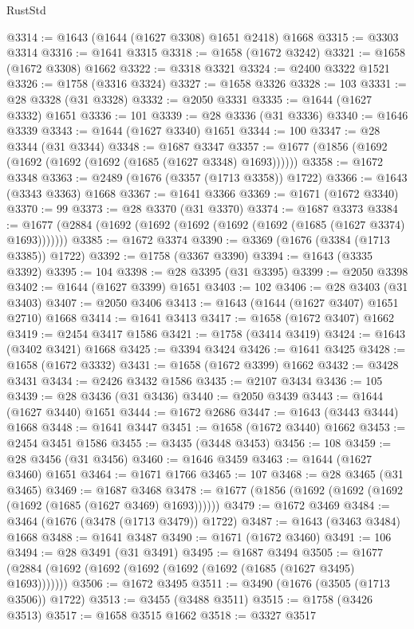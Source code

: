 \begin{lexlean}{RustStd}
\begin{coremodule}
@3314 := @1643 (@1644 (@1627 @3308) @1651 @2418) @1668
@3315 := @3303 @3314
@3316 := @1641 @3315
@3318 := @1658 (@1672 @3242)
@3321 := @1658 (@1672 @3308) @1662
@3322 := @3318 @3321
@3324 := @2400 @3322 @1521
@3326 := @1758 (@3316 @3324)
@3327 := @1658 @3326
@3328 := 103
@3331 := @28 @3328 (@31 @3328)
@3332 := @2050 @3331
@3335 := @1644 (@1627 @3332) @1651
@3336 := 101
@3339 := @28 @3336 (@31 @3336)
@3340 := @1646 @3339
@3343 := @1644 (@1627 @3340) @1651
@3344 := 100
@3347 := @28 @3344 (@31 @3344)
@3348 := @1687 @3347
@3357 := @1677 (@1856 (@1692 (@1692 (@1692 (@1692 (@1685 (@1627 @3348) @1693))))))
@3358 := @1672 @3348
@3363 := @2489 (@1676 (@3357 (@1713 @3358)) @1722)
@3366 := @1643 (@3343 @3363) @1668
@3367 := @1641 @3366
@3369 := @1671 (@1672 @3340)
@3370 := 99
@3373 := @28 @3370 (@31 @3370)
@3374 := @1687 @3373
@3384 := @1677 (@2884 (@1692 (@1692 (@1692 (@1692 (@1692 (@1685 (@1627 @3374) @1693)))))))
@3385 := @1672 @3374
@3390 := @3369 (@1676 (@3384 (@1713 @3385)) @1722)
@3392 := @1758 (@3367 @3390)
@3394 := @1643 (@3335 @3392)
@3395 := 104
@3398 := @28 @3395 (@31 @3395)
@3399 := @2050 @3398
@3402 := @1644 (@1627 @3399) @1651
@3403 := 102
@3406 := @28 @3403 (@31 @3403)
@3407 := @2050 @3406
@3413 := @1643 (@1644 (@1627 @3407) @1651 @2710) @1668
@3414 := @1641 @3413
@3417 := @1658 (@1672 @3407) @1662
@3419 := @2454 @3417 @1586
@3421 := @1758 (@3414 @3419)
@3424 := @1643 (@3402 @3421) @1668
@3425 := @3394 @3424
@3426 := @1641 @3425
@3428 := @1658 (@1672 @3332)
@3431 := @1658 (@1672 @3399) @1662
@3432 := @3428 @3431
@3434 := @2426 @3432 @1586
@3435 := @2107 @3434
@3436 := 105
@3439 := @28 @3436 (@31 @3436)
@3440 := @2050 @3439
@3443 := @1644 (@1627 @3440) @1651
@3444 := @1672 @2686
@3447 := @1643 (@3443 @3444) @1668
@3448 := @1641 @3447
@3451 := @1658 (@1672 @3440) @1662
@3453 := @2454 @3451 @1586
@3455 := @3435 (@3448 @3453)
@3456 := 108
@3459 := @28 @3456 (@31 @3456)
@3460 := @1646 @3459
@3463 := @1644 (@1627 @3460) @1651
@3464 := @1671 @1766
@3465 := 107
@3468 := @28 @3465 (@31 @3465)
@3469 := @1687 @3468
@3478 := @1677 (@1856 (@1692 (@1692 (@1692 (@1692 (@1685 (@1627 @3469) @1693))))))
@3479 := @1672 @3469
@3484 := @3464 (@1676 (@3478 (@1713 @3479)) @1722)
@3487 := @1643 (@3463 @3484) @1668
@3488 := @1641 @3487
@3490 := @1671 (@1672 @3460)
@3491 := 106
@3494 := @28 @3491 (@31 @3491)
@3495 := @1687 @3494
@3505 := @1677 (@2884 (@1692 (@1692 (@1692 (@1692 (@1692 (@1685 (@1627 @3495) @1693)))))))
@3506 := @1672 @3495
@3511 := @3490 (@1676 (@3505 (@1713 @3506)) @1722)
@3513 := @3455 (@3488 @3511)
@3515 := @1758 (@3426 @3513)
@3517 := @1658 @3515 @1662
@3518 := @3327 @3517

\end{coremodule}
\end{lexlean}
